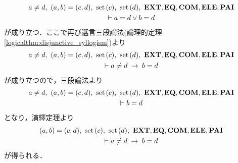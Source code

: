 \begin{sketch}
\begin{description}
\begin{align}
\begin{gathered}
						a \neq d,\ (a,b) = (c,d),\ \set{c},\ \set{d},\ \EXTAX,\EQAX,\COMAX,\ELEAX,\PAIAX \\
						\vdash a = d \vee b = d
					\end{gathered}
				\end{align}
				が成り立つ．ここで再び選言三段論法(論理的定理\ref{logicalthm:disjunctive_syllogism})より
				\begin{align}
					\begin{gathered}
						a \neq d,\ (a,b) = (c,d),\ \set{c},\ \set{d},\ \EXTAX,\EQAX,\COMAX,\ELEAX,\PAIAX \\
						\vdash a \neq d \rarrow b = d
					\end{gathered}
				\end{align}
				が成り立つので，三段論法より
				\begin{align}
					\begin{gathered}
						a \neq d,\ (a,b) = (c,d),\ \set{c},\ \set{d},\ \EXTAX,\EQAX,\COMAX,\ELEAX,\PAIAX \\
						\vdash b = d
					\end{gathered}
				\end{align}
				となり，演繹定理より
				\begin{align}
					\begin{gathered}
						(a,b) = (c,d),\ \set{c},\ \set{d},\ \EXTAX,\EQAX,\COMAX,\ELEAX,\PAIAX \\
						\vdash a \neq d \rarrow b = d
					\end{gathered}
					\label{fom:equality_of_ordered_pairs_18}
				\end{align}
				が得られる．
				

\end{description}
\end{sketch}
